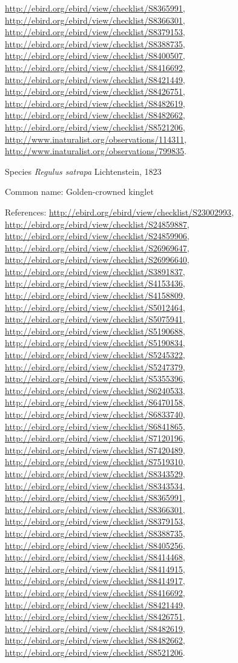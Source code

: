 \documentclass[9pt, article]{memoir}
\begin{document}
\begin{multicols}{2}
\url{http://ebird.org/ebird/view/checklist/S8365991}, 
\url{http://ebird.org/ebird/view/checklist/S8366301}, 
\url{http://ebird.org/ebird/view/checklist/S8379153}, 
\url{http://ebird.org/ebird/view/checklist/S8388735}, 
\url{http://ebird.org/ebird/view/checklist/S8400507}, 
\url{http://ebird.org/ebird/view/checklist/S8416692}, 
\url{http://ebird.org/ebird/view/checklist/S8421449}, 
\url{http://ebird.org/ebird/view/checklist/S8426751}, 
\url{http://ebird.org/ebird/view/checklist/S8482619}, 
\url{http://ebird.org/ebird/view/checklist/S8482662}, 
\url{http://ebird.org/ebird/view/checklist/S8521206}, 
\url{http://www.inaturalist.org/observations/114311}, 
\url{http://www.inaturalist.org/observations/799835}.

\vspace{6pt}\noindent\hspace{36pt}Species \textit{Regulus satrapa} Lichtenstein, 1823


Common name: Golden-crowned kinglet

References: 
\url{http://ebird.org/ebird/view/checklist/S23002993}, 
\url{http://ebird.org/ebird/view/checklist/S24859887}, 
\url{http://ebird.org/ebird/view/checklist/S24859906}, 
\url{http://ebird.org/ebird/view/checklist/S26969647}, 
\url{http://ebird.org/ebird/view/checklist/S26996640}, 
\url{http://ebird.org/ebird/view/checklist/S3891837}, 
\url{http://ebird.org/ebird/view/checklist/S4153436}, 
\url{http://ebird.org/ebird/view/checklist/S4158809}, 
\url{http://ebird.org/ebird/view/checklist/S5012464}, 
\url{http://ebird.org/ebird/view/checklist/S5075941}, 
\url{http://ebird.org/ebird/view/checklist/S5190688}, 
\url{http://ebird.org/ebird/view/checklist/S5190834}, 
\url{http://ebird.org/ebird/view/checklist/S5245322}, 
\url{http://ebird.org/ebird/view/checklist/S5247379}, 
\url{http://ebird.org/ebird/view/checklist/S5355396}, 
\url{http://ebird.org/ebird/view/checklist/S6240533}, 
\url{http://ebird.org/ebird/view/checklist/S6470158}, 
\url{http://ebird.org/ebird/view/checklist/S6833740}, 
\url{http://ebird.org/ebird/view/checklist/S6841865}, 
\url{http://ebird.org/ebird/view/checklist/S7120196}, 
\url{http://ebird.org/ebird/view/checklist/S7420489}, 
\url{http://ebird.org/ebird/view/checklist/S7519310}, 
\url{http://ebird.org/ebird/view/checklist/S8343529}, 
\url{http://ebird.org/ebird/view/checklist/S8343534}, 
\url{http://ebird.org/ebird/view/checklist/S8365991}, 
\url{http://ebird.org/ebird/view/checklist/S8366301}, 
\url{http://ebird.org/ebird/view/checklist/S8379153}, 
\url{http://ebird.org/ebird/view/checklist/S8388735}, 
\url{http://ebird.org/ebird/view/checklist/S8405256}, 
\url{http://ebird.org/ebird/view/checklist/S8414468}, 
\url{http://ebird.org/ebird/view/checklist/S8414915}, 
\url{http://ebird.org/ebird/view/checklist/S8414917}, 
\url{http://ebird.org/ebird/view/checklist/S8416692}, 
\url{http://ebird.org/ebird/view/checklist/S8421449}, 
\url{http://ebird.org/ebird/view/checklist/S8426751}, 
\url{http://ebird.org/ebird/view/checklist/S8482619}, 
\url{http://ebird.org/ebird/view/checklist/S8482662}, 
\url{http://ebird.org/ebird/view/checklist/S8521206}.


\end{multicols}
\end{document}
